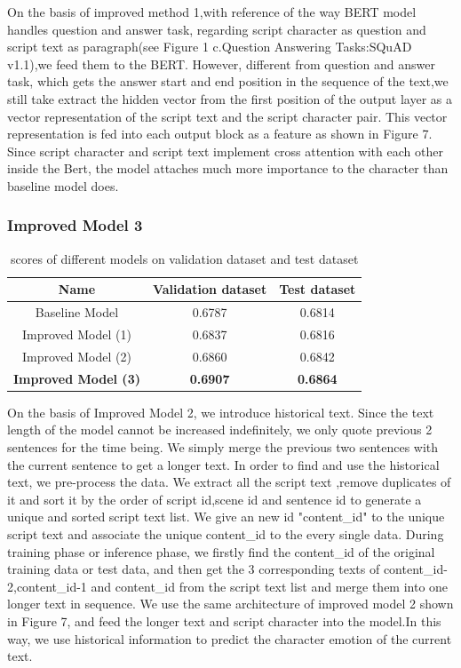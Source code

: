 \documentclass[12pt,twocolumn,letterpaper]{article}
\begin{document}
 On the basis of improved method 1,with reference of the way BERT model handles question and answer task, regarding script character as question and script text as paragraph(see Figure 1 c.Question Answering Tasks:SQuAD v1.1),we feed them to the BERT. However, different from question and answer task, which gets the answer start and end position in the sequence of the text,we still take extract the hidden vector from the first position of the output layer as a vector representation of the script text and the script character pair. This vector representation is fed into each output block as a feature as shown in Figure 7. Since script character and script text implement cross attention with each other inside the Bert, the model attaches much more importance to the character than baseline model does.  
\subsubsection{Improved Model 3}

\begin{table}
\begin{center}
\begin{tabular}{|c|c|c|}
\hline
Name & Validation dataset  & Test dataset\\
\hline 
Baseline Model & 0.6787 & 0.6814\\
\hline 
Improved Model (1) & 0.6837 & 0.6816\\
\hline 
Improved Model (2) & 0.6860 & 0.6842\\
\hline 
\bf Improved Model (3) & \bf 0.6907 & \bf 0.6864\\
\hline 
\end{tabular}
\end{center}
\caption{scores of different models on validation dataset and test dataset}
\end{table}


On the basis of Improved Model 2, we introduce historical text. Since the text length of the model cannot be increased indefinitely, we only quote previous 2 sentences for the time being. We simply merge the previous two sentences with the current sentence to get a longer text. 
In order to find and use the historical text, we pre-process the data. We extract all the script text ,remove duplicates of it and sort it by the order of script id,scene id and sentence id to generate a unique and sorted script text list. We give an new id "content\_id" to the unique script text and associate the unique content\_id to the every single data. During training phase or inference phase, we firstly find the content\_id of the original training data or test data, and then get the 3 corresponding texts of content\_id-2,content\_id-1 and content\_id from the script text list and merge them into one longer text in sequence. We use the same architecture of improved model 2 shown in Figure 7, and feed the longer text and script character into the model.In this way, we use historical information to predict the character emotion of the current text. 
\end{document}
